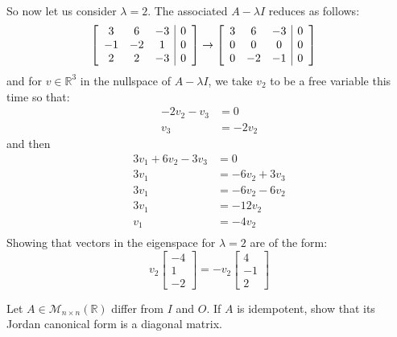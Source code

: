 \documentclass{article}
\begin{document}
\begin{solution}
\paragraph{}
So now let us consider $\lambda = 2$. The associated $A-\lambda I$ reduces as follows:
\begin{align*}
\left[
\begin{array}{c c c | c}
3 & 6 & -3 & 0 \\
-1 & -2 & 1 & 0 \\
2 & 2 & -3 & 0
\end{array}
\right]
&\to
\left[
\begin{array}{c c c | c}
3 & 6 & -3 & 0 \\
0 & 0 & 0 & 0 \\
0 & -2 & -1 & 0
\end{array}
\right]
\end{align*}
and for $v\in\mathbb{R}^{3}$ in the nullspace of $A-\lambda I$, we take $v_{2}$ to be a free variable this time so that:
\begin{align*}
-2v_{2} -v_{3} &= 0 \\
v_{3} &= -2v_{2}
\end{align*}
and then
\begin{align*}
3v_{1} +6v_{2} -3v_{3} &= 0 \\
3v_{1} &= -6v_{2} +3v_{3} \\
3v_{1} &= -6v_{2} -6v_{2} \\
3v_{1} &= -12v_{2} \\
v_{1} &= -4v_{2} \\
\end{align*}
Showing that vectors in the eigenspace for $\lambda = 2$ are of the form:
\[
v_{2}
\begin{bmatrix}
-4\\ 1\\ -2
\end{bmatrix}
=
-v_{2}
\begin{bmatrix}
4\\ -1\\ 2
\end{bmatrix}
\]
\end{solution}

\setcounter{section}{13}
\setcounter{problem}{879}
\begin{problem}
Let $A \in \mathcal{M}_{n\times n}(\mathbb{R})$ differ from $I$ and $O$. If $A$ is idempotent, show that its Jordan canonical form is a diagonal matrix.
\end{problem}
\end{document}
